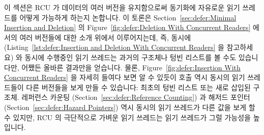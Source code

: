 이 섹션은 RCU 가 데이터의 여러 버전을 유지함으로써 동기화에 자유로운 읽기
쓰레드를 어떻게 가능하게 하는지 논합니다.
이 토론은
Section~\ref{sec:defer:Minimal Insertion and Deletion} 의
Figure~\ref{fig:defer:Deletion With Concurrent Readers}
에서의 여러 버전들에 대한 소개 위에서 이루어지는데, 즉, 동시에 
(Listing~\ref{lst:defer:Insertion and Deletion With Concurrent Readers} 을
참고하세요) 와 동시에 수행중인 읽기 쓰레드는 과거의  구조체나 텅빈
리스트를 볼 수도 있습니다만, 어쨌든 올바른 결과만을 얻습니다.
물론, Figure~\ref{fig:defer:Insertion With Concurrent Readers} 을 자세히 들여다
보면 알 수 있듯이  호출 역시 동시의 읽기 쓰레드들이 다른
버전들을 보게 만들 수 있습니다: 최초의 텅빈 리스트 또는 새로 삽입된 
구조체.
레퍼런스 카운팅
(Section~\ref{sec:defer:Reference Counting})
과 해저드 포인터
(Section~\ref{sec:defer:Hazard Pointers})
역시 동시의 읽기 쓰레드가 다른 값을 보게 할 수 있지만, RCU 의 극단적으로 가벼운
읽기 쓰레드는 읽기 쓰레드가 그럴 가능성을 높입니다.

